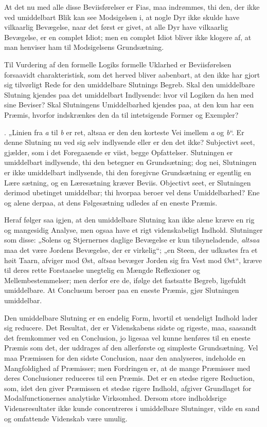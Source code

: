 \documentclass[12pt]{book}
\newcommand{\opage}[1]{\marginnote{\footnotesize\textit{[#1]}}}
\begin{document}
{{} At det nu med alle disse Beviisførelser er Fias, maa indrømmes, thi den, der ikke ved umiddelbart Blik kan see Modsigelsen i, at nogle Dyr ikke skulde have vilkaarlig Bevægelse, naar det først er givet, at alle Dyr have vilkaarlig Bevægelse, er en complet Idiot; men en complet Idiot bliver ikke klogere af, at man henviser ham til Modsigelsens Grundsætning.\par Til Vurdering af den formelle Logiks formelle Uklarhed er Beviisførelsen forsaavidt charakteristisk, som det herved bliver aabenbart, at den ikke har gjort sig tilvørligt%
{} Rede for den umiddelbare Slutnings Begreb. Skal den umiddelbare Slutning kjendes paa det umiddelbart Indlysende: hvor vil Logiken da hen med sine Beviser? Skal Slutningens Umiddelbarhed kjendes paa, at den kun har een Præmis, hvorfor indskrænkes den da til intetsigende Former og Exempler?}%
. „Linien fra \textit{a} til \textit{b} er ret, altsaa er
\opage{310}den den korteste Vei imellem \textit{a} og \textit{b}“. Er denne Slutning nu ved sig selv indlysende eller er den det ikke? Subjectivt seet, gjælder, som i det Foregaaende er viist, begge Opfattelser. Slutningen er umiddelbart indlysende, thi den betegner en Grundsætning; dog nei, Slutningen er ikke umiddelbart indlysende, thi den foregivne Grundsætning er egentlig en Lære%
\opage{311}sætning, og en Læresætning kræver Beviis. Objectivt seet, er Slutningen derimod ubetinget umiddelbar; thi hvorpaa beroer vel dens Umiddelbarhed? Ene og alene derpaa, at dens Følgesætning udledes af en eneste Præmis.

Heraf følger saa igjen, at den umiddelbare Slutning kan ikke alene kræve en rig og mangesidig Analyse, men ogsaa have et rigt videnskabeligt Indhold. Slutninger som disse: „Solens og Stjernernes daglige Bevægelse er kun tilsyneladende, \emph{altsaa} maa det være Jordens Bevægelse, der er virkelig“; „en Steen, der udkastes fra et høit Taarn, afviger mod Øst, \emph{altsaa} bevæger Jorden sig fra Vest mod Øst“, kræve til deres rette Forstaaelse unegtelig en Mængde Reflexioner og Mellembestemmelser; men derfor ere de, ifølge det fastsatte Begreb, ligefuldt umiddelbare. At Conclusum beroer paa en eneste Præmis, gjør Slutningen umiddelbar.

Den umiddelbare Slutning er en endelig Form, hvortil et uendeligt Indhold lader sig reducere. Det Resultat, der er Videnskabens sidste og rigeste, maa, saasandt det fremkommer ved en Conclusion, jo ligesaa vel kunne henføres til en eneste Præmis som det, der uddrages af den allerførste og simpleste Grundsætning. Vel maa Præmissen for den sidste Conclusion, naar den analyseres, indeholde en Mangfoldighed af Præmisser; men Fordringen er, at de mange Præmisser med deres Conclusioner reduceres til een Præmis. Det er en stedse rigere Reduction, som, idet den giver Præmissen et stedse rigere Indhold, afgiver Grundlaget for Modalfunctionernes analytiske Virksomhed. Dersom store indholdsrige Vidensresultater ikke kunde concentreres i umiddelbare Slutninger, vilde en sand og omfattende Videnskab være umulig.
\end{document}
